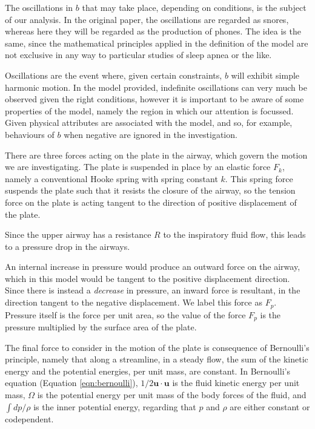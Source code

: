 \documentclass{article}
\begin{document}

The oscillations in $b$ that may take place, depending on conditions, is the subject of our analysis.
In the original paper, the oscillations are regarded as snores,
whereas here they will be regarded as the production of phones.
The idea is the same, since the mathematical principles applied in the definition of the model are not exclusive in any way to particular studies of sleep apnea or the like.

Oscillations are the event where, given certain constraints, $b$ will exhibit simple harmonic motion. %
In the model provided, indefinite oscillations can very much be observed given the right conditions,
however it is important to be aware of some properties of the model,
namely the region in which our attention is focussed. Given physical attributes are associated with the model,
and so, for example, behaviours of $b$ when negative are ignored in the investigation.

There are three forces acting on the plate in the airway, which govern the motion we are investigating.
The plate is suspended in place by an elastic force $F_k$, namely a conventional Hooke spring with spring constant $k$.
This spring force suspends the plate such that it resists the closure of the airway,
so the tension force on the plate is acting tangent to the direction of positive displacement of the plate.


Since the upper airway has a resistance $R$ to the inspiratory fluid flow,
this leads to a pressure drop in the airways. %

An internal increase in pressure would produce an outward force on the airway,
which in this model would be tangent to the positive displacement direction.
Since there is instead a \textit{decrease} in pressure, an inward force is resultant,
in the direction tangent to the negative displacement. We label this force as $F_p$.
Pressure itself is the force per unit area,
so the value of the force $F_p$ is the pressure multiplied by the surface area of the plate.

The final force to consider in the motion of the plate is consequence of Bernoulli's principle,
namely that along a streamline, in a steady flow,
the sum of the kinetic energy and the potential energies, per unit mass, are constant.
In Bernoulli's equation (Equation \ref{eqn:bernoulli}), $1/2\mathbf{u}\cdot\mathbf{u}$ is the fluid kinetic energy per unit mass,  %
$\Omega$ is the potential energy per unit mass of the body forces of the fluid,
and $\int dp/\rho$ is the inner potential energy, regarding that $p$ and $\rho$ are either constant or codependent.
\end{document}
